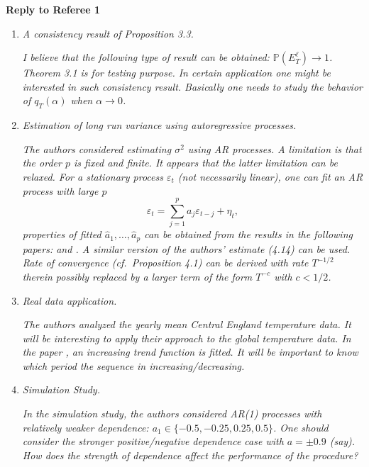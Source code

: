 \documentclass[a4paper,12pt]{article}
\begin{document}
 
\newpage
\begin{center}
{\large \bf Reply to Referee 1} 
\end{center}



\begin{enumerate}[label=(\arabic*),leftmargin=0.8cm]

\item \textit{A consistency result of Proposition 3.3.}

\textit{I believe that the following type of result can be obtained: $\mathbb{P} (E^{\ell}_T) \to 1$. Theorem 3.1 is for testing purpose. In certain application one might be interested in such consistency result. Basically one needs to study the behavior of $q_T(\alpha)$ when $\alpha \to 0$.}


\item \textit{Estimation of long run variance using autoregressive processes.}

\textit{The authors considered estimating $\sigma^2$ using AR processes. A limitation is that the order $p$ is fixed and finite. It appears that the latter limitation can be relaxed. For a stationary process $\varepsilon_t$ (not necessarily linear), one can fit an AR process with large $p$}
\[ \varepsilon_t = \sum_{j=1}^p a_j \varepsilon_{t-j} + \eta_t, \]
\textit{properties of fitted $\widehat{a}_1, \ldots, \widehat{a}_p$ can be obtained from the results in the following papers: \cite{WuPourahmadi2009} and \cite{XiaoWu2012}.
A similar version of the authors' estimate (4.14) can be used. Rate of convergence (cf.\ Proposition 4.1) can be derived with rate $T^{-1/2}$ therein possibly replaced by a larger term of the form $T^{-c}$ with $c < 1/2$.}


\item \textit{Real data application.}

\textit{The authors analyzed the yearly mean Central England temperature data. It will be interesting to apply their approach to the global temperature data. In the paper \cite{WuWoodroofeMentz2001}, an increasing trend function is fitted. It will be important to know which period the sequence in increasing/decreasing.}


\item \textit{Simulation Study.}

\textit{In the simulation study, the authors considered AR(1) processes with relatively weaker dependence: $a_1 \in \{-0.5, -0.25, 0.25, 0.5\}$. One should consider the \linebreak stronger positive/negative dependence case with $a = \pm 0.9$ (say). How does the strength of dependence affect the performance of the procedure?}

\end{enumerate}
\end{document}
